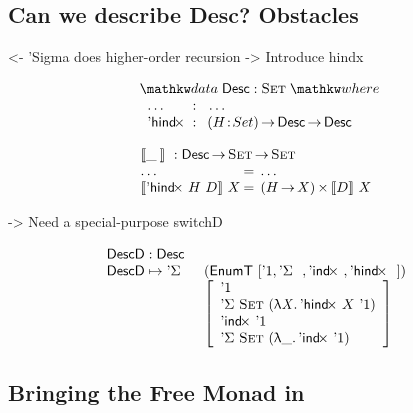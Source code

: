 \documentclass[preprint, authoryear]{sigplanconf}
\newenvironment{structure}{\footnotesize\verbatim}{\endverbatim}
\begin{document}
\subsection{Can we describe Desc? Obstacles}

\begin{structure}
<- 'Sigma does higher-order recursion
    -> Introduce hindx
\end{structure}

\[
\stk{
\data \Desc : \Set \where \\
\;\;\begin{array}{@{}l@{\::\:\:}l@{\quad}l}
    \ldots          & \:\:\ldots \\
    \DHindx         & \PI{H}{Set} \Desc \To \Desc
\end{array}
}
\]

\[\stk{
\descop{\_\:}{} : \Desc \To \Set \To \Set \\
\begin{array}{@{}l@{\:=\:\:}ll}
\ldots                        &  \ldots \\
\descop{\DHindx{H}{D}}{X}     &  \TIMES{(H \To X)}{\descop{D}{X}}
\end{array}
}\]

\begin{structure}
    -> Need a special-purpose switchD
\end{structure}


\[\stk{
\DescD : \Desc \\
\begin{array}{@{}ll}
\DescD \mapsto \DSigma{}{} & (\EnumT [ \DUnit, \DSigma{}{}, \DIndx{}, \DHindx{}{} ]) \\
                           & \left[\begin{array}{l}
                                   \DUnit                                \\
                                   \DSigma{\Set}{(\LAM{\V{X}} \DHindx{X}{\DUnit})} \\
                                   \DIndx{\DUnit}                                  \\
                                   \DSigma{\Set}{(\LAM{\_} \DIndx{\DUnit})}
                                   \end{array}
                             \right]
\end{array}
}
\]

\subsection{Bringing the Free Monad in}
\end{document}

